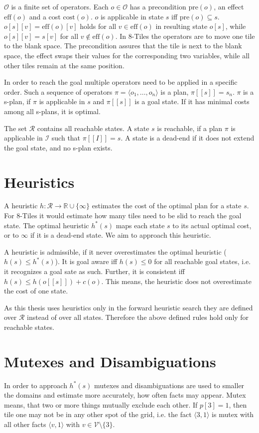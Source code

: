 $\mathcal{O}$ is a finite set of operators.
Each $o\in\mathcal{O}$ has a precondition $\text{pre}(o)$, an effect $\text{eff}(o)$ and a cost $\text{cost}(o)$.
$o$ is applicable in state $s$ iff $\text{pre}(o)\subseteq s$.
$o[s][v] = \text{eff}(o)[v]$ holds for all $v\in \text{eff}(o)$ in resulting state $o[s]$, while $o[s][v]=s[v]$ for all $v\notin \text{eff}(o)$.
In 8-Tiles the operators are to move one tile to the blank space.
The precondition assures that the tile is next to the blank space, the effect swaps their values for the corresponding two variables, while all other tiles remain at the same position.


In order to reach the goal multiple operators need to be applied in a specific order.
Such a sequence of operators $\pi=\langle o_1,\dots, o_n\rangle$ is a plan, $\pi[[s]] = s_n$.
$\pi$ is a s-plan, if $\pi$ is applicable in $s$ and $\pi[[s]]$ is a goal state.
If it has minimal costs among all s-plans, it is optimal.

The set $\mathcal{R}$ contains all reachable states.
A state $s$ is reachable, if a plan $\pi$ is applicable in $\mathcal{I}$ such that $\pi[[I]] = s$.
A state is a dead-end if it does not extend the goal state, and no s-plan exists.


\section{Heuristics}
A heuristic $h:\mathcal{R} \rightarrow \mathbb{R} \cup \{\infty\} $ estimates the cost of the optimal plan for a state $s$.
For 8-Tiles it would estimate how many tiles need to be slid to reach the goal state.
The optimal heuristic $h^*(s)$ maps each state $s$  to its actual optimal cost, or to $\infty$ if it is a dead-end state.
We aim to approach this heuristic.

A heuristic is admissible, if it never overestimates the optimal heuristic ($h(s)\leq h^*(s)$).
It is goal aware iff $h(s)\leq 0$ for all reachable goal states, i.e. it recognizes a goal sate as such.
Further, it is consistent iff $h(s)\leq h(o[[s]])+c(o)$.
This means, the heuristic does not overestimate the cost of one state.

As this thesis uses heuristics only in the forward heuristic search they are defined over $\mathcal{R}$ instead of over all states.
Therefore the above defined rules hold only for reachable states.


\section{Mutexes and Disambiguations}
In order to approach $h^*(s)$ mutexes and disambiguations are used to smaller the domains and estimate more accurately, how often facts may appear.
Mutex means, that two or more things mutually exclude each other.
If $p[3]=1$, then tile one may not be in any other spot of the grid, i.e. the fact $\langle 3, 1\rangle$ is mutex with all
other facts $\langle v, 1\rangle$ with $v\in \mathcal{V}\setminus \{3\}$.


